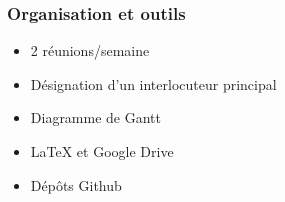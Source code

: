 \begin{frame}

	\frametitle{Organisation et outils}
	
	\begin{itemize}
		\item 2 réunions/semaine
	\end{itemize}
	\begin{itemize}
		\item Désignation d'un interlocuteur principal
	\end{itemize}
	\begin{itemize}
		\item Diagramme de Gantt
	\end{itemize}
	\begin{itemize}
		\item LaTeX et Google Drive
	\end{itemize}
	\begin{itemize}
		\item Dépôts Github
	\end{itemize}
	
\end{frame}
